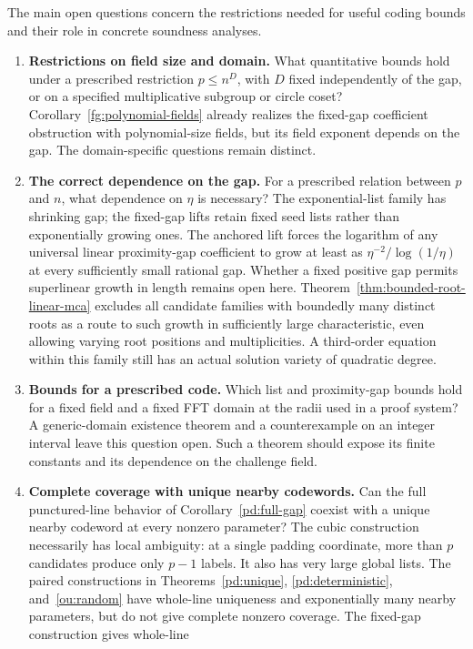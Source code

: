 \documentclass[11pt,letterpaper]{article}
\theoremstyle{definition}
\theoremstyle{remark}
\begin{document}
The main open questions concern the restrictions needed for useful
coding bounds and their role in concrete soundness analyses.
\begin{enumerate}
\item \textbf{Restrictions on field size and domain.}
What quantitative bounds hold under a prescribed restriction $p\le n^D$,
with $D$ fixed independently of the gap, or on a specified multiplicative
subgroup or circle coset? Corollary~\ref{fg:polynomial-fields} already
realizes the fixed-gap coefficient obstruction with polynomial-size
fields, but its field exponent depends on the gap. The domain-specific
questions remain distinct.
\item \textbf{The correct dependence on the gap.}
For a prescribed relation between $p$ and $n$, what dependence on
$\eta$ is necessary? The exponential-list family has shrinking gap;
the fixed-gap lifts retain fixed seed lists rather than exponentially
growing ones. The anchored lift forces the logarithm of any universal
linear proximity-gap coefficient to grow at least as
$\eta^{-2}/\log(1/\eta)$ at every sufficiently small rational gap. Whether a fixed
positive gap permits superlinear growth in length remains open here.
Theorem~\ref{thm:bounded-root-linear-mca} excludes all candidate
families with boundedly many distinct roots as a route to such growth
in sufficiently large characteristic, even allowing varying root
positions and multiplicities. A third-order equation within this family
still has an actual solution variety of quadratic degree.
\item \textbf{Bounds for a prescribed code.}
Which list and proximity-gap bounds hold for a fixed field and a fixed
FFT domain at the radii used in a proof system? A generic-domain
existence theorem and a counterexample on an integer interval leave
this question open. Such a theorem should expose its finite constants
and its dependence on the challenge field.
\item \textbf{Complete coverage with unique nearby codewords.}
Can the full punctured-line behavior of Corollary~\ref{pd:full-gap}
coexist with a unique nearby codeword at every nonzero parameter?
The cubic construction necessarily has local ambiguity: at a single
padding coordinate, more than $p$ candidates produce only $p-1$ labels.
It also has very large global lists. The paired constructions in
Theorems~\ref{pd:unique}, \ref{pd:deterministic}, and~\ref{ou:random} have whole-line
uniqueness and exponentially many nearby parameters, but do not give
complete nonzero coverage. The fixed-gap construction gives whole-line

\end{enumerate}
\end{document}
